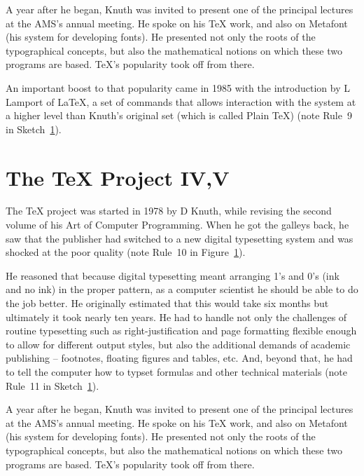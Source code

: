 \documentclass[12pt]{book}
\begin{document}

A year after he began, Knuth was invited to present one of the principal lectures at the AMS's annual meeting. He spoke on his TeX work,
and also on Metafont (his system for developing fonts). He presented not only the roots of the typographical concepts, but also the
mathematical notions on which these two programs are based. TeX's popularity took off from there.

An important boost to that popularity came in 1985 with the introduction by L Lamport of LaTeX, a set of commands that allows interaction
with the system at a higher level than Knuth's original set (which is called Plain TeX) (note Rule~9 in Sketch~\ref{}).


\section{The TeX Project IV,V}

The TeX project was started in 1978 by D Knuth, while revising the second volume of his Art of Computer Programming. When he got the
galleys back, he saw that the publisher had switched to a new digital typesetting system and was shocked at the poor quality (note Rule~10 in Figure~\ref{}).


He reasoned that because digital typesetting meant arranging 1's and 0's (ink and no ink) in the proper pattern, as a computer scientist
he should be able to do the job better. He originally estimated that this would take six months but ultimately it took nearly ten years.
He had to handle not only the challenges of routine typesetting such as right-justification and page formatting flexible enough to allow
for different output styles, but also the additional demands of academic publishing -- footnotes, floating figures and tables, etc. And,
beyond that, he had to tell the computer how to typset formulas and other technical materials (note Rule~11 in Sketch~\ref{}).


A year after he began, Knuth was invited to present one of the principal lectures at the AMS's annual meeting. He spoke on his TeX work,
and also on Metafont (his system for developing fonts). He presented not only the roots of the typographical concepts, but also the
mathematical notions on which these two programs are based. TeX's popularity took off from there.
\end{document}
